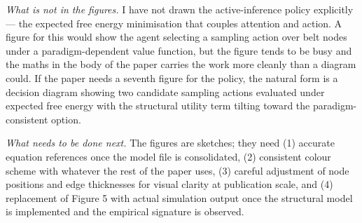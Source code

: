 \documentclass[11pt]{article}
\begin{document}
\textit{What is not in the figures.} I have not drawn the active-inference policy explicitly — the expected free energy minimisation that couples attention and action. A figure for this would show the agent selecting a sampling action over belt nodes under a paradigm-dependent value function, but the figure tends to be busy and the maths in the body of the paper carries the work more cleanly than a diagram could. If the paper needs a seventh figure for the policy, the natural form is a decision diagram showing two candidate sampling actions evaluated under expected free energy with the structural utility term tilting toward the paradigm-consistent option.

\textit{What needs to be done next.} The figures are sketches; they need (1) accurate equation references once the model file is consolidated, (2) consistent colour scheme with whatever the rest of the paper uses, (3) careful adjustment of node positions and edge thicknesses for visual clarity at publication scale, and (4) replacement of Figure 5 with actual simulation output once the structural model is implemented and the empirical signature is observed.
\end{document}
